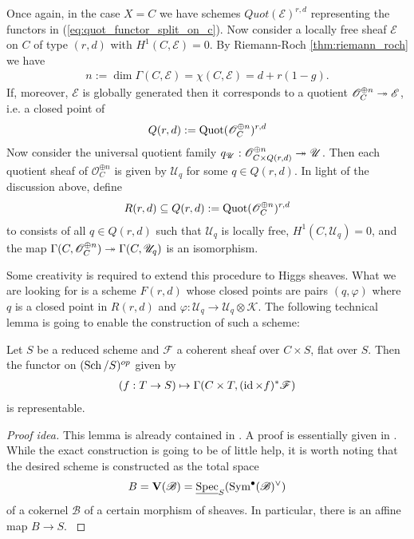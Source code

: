 \documentclass[12pt]{ociamthesis}  %
\begin{document}
\begin{example}\label{ex:quot_scheme_of_lf}
  Once again, in the case $X=C$ we have schemes
  $Quot(\mathscr E)^{r,d}$ representing the functors in
  (\ref{eq:quot_functor_split_on_c}). Now consider a locally free
  sheaf $\mathscr E$ on $C$ of type $(r,d)$ with $H^1(C,\mathscr E)=0$. By Riemann-Roch
  \ref{thm:riemann_roch} we have
  \begin{align*}
    n := \dim\Gamma(C,\mathscr E) = \chi(C,\mathscr E) = d + r(1-g).
  \end{align*}
  If, moreover, $\mathscr E$ is globally generated then it
  corresponds to a quotient $\mathscr O^{\oplus n}_C\twoheadrightarrow \mathscr E$,
  i.e. a closed point of
  \begin{align*}
    Q(r,d) := \operatorname{Quot}(\mathscr O^{\oplus n}_C)^{r,d}
  \end{align*}
  Now consider the universal quotient family
  $q_{\mathscr U} : \mathscr O^{\oplus n}_{C\times Q(r,d)} \twoheadrightarrow \mathscr U$.
  Then each quotient sheaf of $\mathscr O_C^{\oplus n}$ is given by
  $\mathscr U_q$ for some $q\in Q(r,d)$. In light of the discussion
  above, define
  \begin{align*}
    R(r,d) \subseteq Q(r,d) := \operatorname{Quot}(\mathscr O^{\oplus n}_C)^{r,d}
  \end{align*}
  to consists of all $q\in Q(r,d)$ such that $\mathscr U_q$ is locally
  free, $H^1(C,\mathscr U_q)=0$, and the map
  $\Gamma(C,\mathscr O^{\oplus n}_C)\twoheadrightarrow\Gamma(C,\mathscr U_q)$ is
  an isomorphism.
\end{example}

Some creativity is required to extend this procedure to Higgs
sheaves. What we are looking for is a scheme $F(r,d)$ whose closed points
are pairs $(q,\varphi)$ where $q$ is a closed point
in $R(r,d)$ and $\varphi : \mathscr U_q \to \mathscr U_q \otimes \mathscr K$.
The following technical lemma is going to enable the construction of
such a scheme:

\begin{lemma}\label{lem:linear_scheme}
  Let $S$ be a reduced scheme and $\mathscr F$ a coherent sheaf over
  $C\times S$, flat over $S$. Then the functor on $(\operatorname{Sch}/S)^{op}$ given by
  \begin{align*}
    (f : T\to S) \mapsto \Gamma(C\times T,(\operatorname{id}\times f)^*\mathscr F)
  \end{align*}
  is representable.
  \begin{proof}[Proof idea]
    This lemma is already contained in \cite{grothendieck1963}. A proof is
    essentially given in \cite[206-207]{bosch2012}. While the exact construction is
    going to be of little help, it is worth noting that the
    desired scheme is constructed as the total space
    \begin{align*}
      B = \mathbf V(\mathscr B)=\underline{\operatorname{Spec}}_S(\operatorname{Sym}^\bullet(\mathscr B)^\vee)
    \end{align*}
    of a cokernel $\mathscr B$ of a certain morphism of sheaves. In
    particular, there is an affine map $B \to S$. \cite[\href{https://stacks.math.columbia.edu/tag/01LX}{Tag 01LX}]{stacks-project}
  \end{proof}
\end{lemma}
\end{document}
